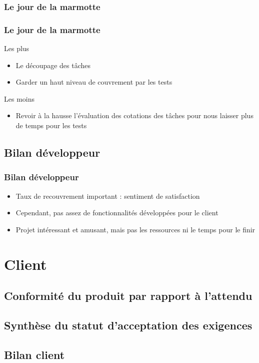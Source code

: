 \documentclass{beamer}
\begin{document}
      \subsubsection{Le jour de la marmotte}
      \begin{frame}
        \frametitle{Le jour de la marmotte}
        \begin{block}{Les plus}
          \begin{itemize}
            \item Le découpage des tâches
            \item Garder un haut niveau de couvrement par les tests
          \end{itemize}
        \end{block}
        \begin{block}{Les moins}
          \begin{itemize}
            \item Revoir à la hausse l'évaluation des cotations des tâches pour nous laisser plus de temps pour les tests
          \end{itemize}
        \end{block}
      \end{frame}
      
    \subsection{Bilan développeur}
    \begin{frame}
      \frametitle{Bilan développeur}
      \begin{block}{}
        \begin{itemize}
          \item Taux de recouvrement important : sentiment de satisfaction
          \item Cependant, pas assez de fonctionnalités développées pour le client
          \item Projet intéressant et amusant, mais pas les ressources ni le temps pour le finir
        \end{itemize}
      \end{block}
    \end{frame}
    
  \section{Client}
  
    \begin{frame}
    	\tableofcontents[currentsection]
    \end{frame}
  
    \subsection{Conformité du produit par rapport à l'attendu}
    
    \subsection{Synthèse du statut d'acceptation des exigences}
    
    \subsection{Bilan client}
      
\end{document}
